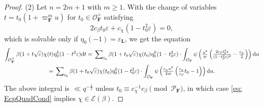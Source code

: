 \documentclass[A4]{amsart}
\def\geq{\geqslant}
\numberwithin{equation}{section} \everymath{\displaystyle}
\newcommand{\ud}{\mathrm{d}}
\newcommand{\F}{\mathbf{F}}
\newcommand{\bL}{\mathbf{L}}
\newcommand{\vO}{\mathcal{O}}
\newcommand{\vP}{\mathcal{P}}
\newcommand{\Ecp}{\boldsymbol{\mathcal{E}}}
\begin{document}
\begin{proof}
\noindent (2) Let $n=2m+1$ with $m \geq 1$. With the change of variables $t=t_0(1+\varpi_{\F}^m u)$ for $t_0 \in \vO_{\F}^{\times}$ satisfying
\begin{equation} \label{eq: EcpQuadCond}
	2 c_{\beta} t_0 \varepsilon + c_{\chi}(1- t_0^2 \varepsilon) = 0,
\end{equation}
	which is solvable only if $\eta_0(-1) = \varepsilon_{\bL}$, we get the equation
\begin{multline*}
	\int_{\vO_{\F}^{\times}} \beta(1+t \sqrt{\varepsilon}) \chi(t) \eta_0^k(1-t^2 \varepsilon) \ud t = \sideset{}{_{t_0}} \sum \beta(1+t_0 \sqrt{\varepsilon}) \chi(t_0) \eta_0^k(1-t_0^2 \varepsilon) \cdot \int_{\vO_{\F}} \psi \left( \tfrac{u^2}{\varpi} \left( \tfrac{2 c_{\beta} t_0^3 \varepsilon}{(1-t_0^2 \varepsilon)^2} - \tfrac{c_{\chi}}{2} \right) \right) \ud u \\
	= \sideset{}{_{t_0}} \sum \beta(1+t_0 \sqrt{\varepsilon}) \chi(t_0) \eta_0^k(1-t_0^2 \varepsilon) \cdot \int_{\vO_{\F}} \psi \left( \tfrac{c_{\chi} u^2}{2 \varpi} \left( \tfrac{c_{\chi}}{c_{\beta}} t_0 - 1 \right) \right) \ud u.
\end{multline*}
	The above integral is $\ll q^{-\frac{1}{2}}$ unless $t_0 \equiv c_{\chi}^{-1}c_{\beta} \pmod{\vP_{\F}}$, in which case \eqref{eq: EcpQuadCond} implies $\chi \in \Ecp(\beta)$.
\end{proof}
\end{document}
